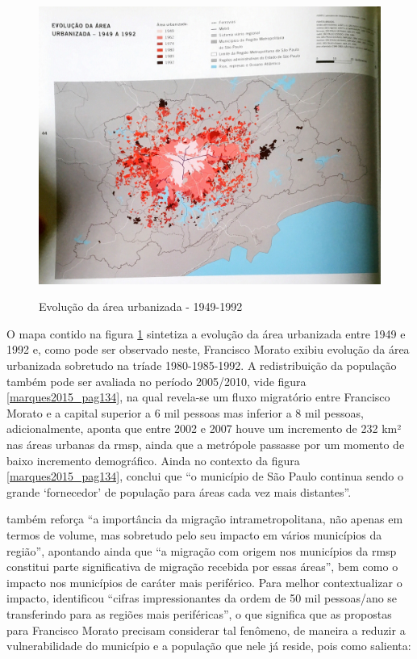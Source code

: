 	\begin{figure}[h]
		\centering
		\caption{Evolução da área urbanizada - 1949-1992}
		\includegraphics[width=\linewidth,keepaspectratio]{img/spmetrop_pag044}
		\label{spmetrop_pag044}
	\end{figure}
	
	O mapa contido na figura \ref{spmetrop_pag044} sintetiza a evolução da área urbanizada entre 1949 e 1992 e, como pode ser observado neste, Francisco Morato exibiu evolução da área urbanizada sobretudo na tríade 1980-1985-1992. A redistribuição da população também pode ser avaliada no período 2005/2010, vide figura \ref{marques2015_pag134}, na qual revela-se um fluxo migratório entre Francisco Morato e a capital superior a 6 mil pessoas mas inferior a 8 mil pessoas, adicionalmente,  aponta que entre 2002 e 2007 houve um incremento de 232 km² nas áreas urbanas da \gls{rmsp}, ainda que a metrópole passasse por um momento de baixo incremento demográfico. Ainda no contexto da figura \ref{marques2015_pag134},  conclui que ``o município de São Paulo continua sendo o grande `fornecedor' de população para áreas cada vez mais distantes''.
	
	 também reforça ``a importância da migração intrametropolitana, não apenas em termos de volume, mas sobretudo pelo seu impacto em vários municípios da região'', apontando ainda que ``a migração com origem nos municípios da \gls{rmsp} constitui parte significativa de migração recebida por essas áreas'', bem como o impacto nos municípios de caráter mais periférico. Para melhor contextualizar o impacto,  identificou ``cifras impressionantes da ordem de 50 mil pessoas/ano se transferindo para as regiões mais periféricas'', o que significa que as propostas para Francisco Morato precisam considerar tal fenômeno, de maneira a reduzir a vulnerabilidade do município e a população que nele já reside, pois como \cite[p.137]{marques2015} salienta:
	
